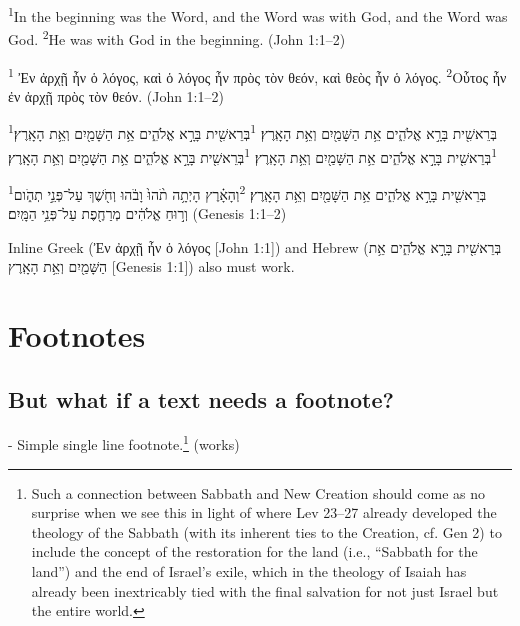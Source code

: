 \documentclass{article}
\begin{document}
	
	\textsuperscript{1}In the beginning was the Word, and the Word was with God,
	and the Word was God. \textsuperscript{2}He was with God in the beginning.
	(John 1:1–2)
	
	
	\textsuperscript{1} Ἐν ἀρχῇ ἦν ὁ λόγος, καὶ ὁ λόγος ἦν πρὸς τὸν θεόν, καὶ θεὸς
	ἦν ὁ λόγος. \textsuperscript{2}Οὗτος ἦν ἐν ἀρχῇ πρὸς τὸν θεόν.
	\foreignlanguage{british}{(John 1:1–2)}
	
	\textsuperscript{1}בְּרֵאשִׁ֖ית בָּרָ֣א אֱלֹהִ֑ים אֵ֥ת הַשָּׁמַ֖יִם וְאֵ֥ת הָאָֽרֶץ׃
	\textsuperscript{1}בְּרֵאשִׁ֖ית בָּרָ֣א אֱלֹהִ֑ים אֵ֥ת הַשָּׁמַ֖יִם וְאֵ֥ת הָאָֽרֶץ׃
	\textsuperscript{1}בְּרֵאשִׁ֖ית בָּרָ֣א אֱלֹהִ֑ים אֵ֥ת הַשָּׁמַ֖יִם וְאֵ֥ת הָאָֽרֶץ׃
	\textsuperscript{1}בְּרֵאשִׁ֖ית בָּרָ֣א אֱלֹהִ֑ים אֵ֥ת הַשָּׁמַ֖יִם וְאֵ֥ת הָאָֽרֶץ׃
	
	\textsuperscript{1}בְּרֵאשִׁ֖ית בָּרָ֣א אֱלֹהִ֑ים אֵ֥ת הַשָּׁמַ֖יִם וְאֵ֥ת הָאָֽרֶץ׃
	\textsuperscript{2}וְהָאָ֗רֶץ הָיְתָ֥ה תֹ֨הוּ֙ וָבֹ֔הוּ וְחֹ֖שֶׁךְ עַל־פְּנֵ֣י תְהֹ֑ום וְר֣וּחַ אֱלֹהִ֔ים מְרַחֶ֖פֶת
	עַל־פְּנֵ֥י הַמָּֽיִם׃ \foreignlanguage{british}{(Genesis 1:1–2)}
	
	
	Inline Greek (\foreignlanguage{polutonikogreek}{Ἐν ἀρχῇ ἦν ὁ λόγος} [John 1:1]) and
	Hebrew (\foreignlanguage{hebrew}{בְּרֵאשִׁ֖ית בָּרָ֣א אֱלֹהִ֑ים אֵ֥ת הַשָּׁמַ֖יִם וְאֵ֥ת הָאָֽרֶץ} [Genesis 1:1]) also must work.

\section{Footnotes}

\subsection{But what if a text needs a footnote?}

- Simple single line footnote.\footnote{
	Such a connection between Sabbath and New Creation should come as no surprise when we see this in light of where Lev 23--27 already developed the theology of the Sabbath (with its inherent ties to the Creation, cf. Gen 2) to include the concept of the restoration for the land (i.e., ``Sabbath for the land'') and the end of Israel's exile, which in the theology of Isaiah has already been inextricably tied with the final salvation for not just Israel but the entire world.} (works)
	
\end{document}
